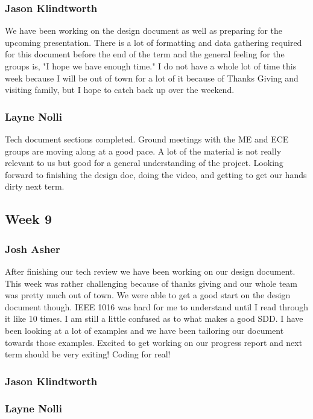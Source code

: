 \documentclass[10pt,draftclsnofoot,onecolumn]{IEEEtran}
\begin{document}
\subsubsection{Jason Klindtworth} We have been working on the design document as well as preparing for the upcoming presentation. There is a lot of formatting and data gathering required for this document before the end of the term and the general feeling for the groups is, "I hope we have enough time." I do not have a whole lot of time this week because I will be out of town for a lot of it because of Thanks Giving and visiting family, but I hope to catch back up over the weekend.

\subsubsection{Layne Nolli} Tech document sections completed. Ground meetings with the ME and ECE groups are moving along at a good pace. A lot of the material is not really relevant to us but good for a general understanding of the project. Looking forward to finishing the design doc, doing the video, and getting to get our hands dirty next term.

\subsection{Week 9}

\subsubsection{Josh Asher} After finishing our tech review we have been working on our design document. This week was rather challenging because of thanks giving and our whole team was pretty much out of town. We were able to get a good start on the design document though. IEEE 1016 was hard for me to understand until I read through it like 10 times. I am still a little confused as to what makes a good SDD. I have been looking at a lot of examples and we have been tailoring our document towards those examples. Excited to get working on our progress report and next term should be very exiting! Coding for real!

\subsubsection{Jason Klindtworth}

\subsubsection{Layne Nolli}
\end{document}
